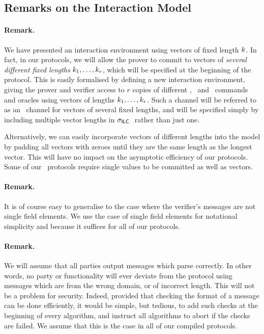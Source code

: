 \subsection{Remarks on the Interaction Model}

\paragraph{Remark.} We have presented an interaction environment using vectors of fixed length $k$. In fact, in our protocols, we will allow the prover to commit to vectors of \emph{several different fixed lengths} $k_1,\ldots,k_r$, which will be specified at the beginning of the protocol. This is easily formalised by defining a new interaction environment, giving the prover and verifier access to $r$ copies of different \ILCcommit, \ILCopen\ and \ILCcheck\ commands and oracles using vectors of lengths $k_1,\ldots,k_r$. Such a channel will be referred to as an \ILC\ channel for vectors of several fixed lengths, and will be specified simply by including multiple vector lengths in $\mathsf{\sigma}_{\mathsf{ILC}~}$ rather than just one.

Alternatively, we can easily incorporate vectors of different lengths into the model by padding all vectors with zeroes until they are the same length as the longest vector. This will have no impact on the asymptotic efficiency of our protocols. Some of our \ILC\ protocols require single values to be committed as well as vectors.

\paragraph{Remark.} It is of course easy to generalise to the case where the verifier's messages are not single field elements. We use the case of single field elements for notational simplicity and because it suffices for all of our protocols.

\paragraph{Remark.} We will assume that all parties output messages which parse correctly. In other words, no party or functionality will ever deviate from the protocol using messages which are from the wrong domain, or of incorrect length. This will not be a problem for security. Indeed, provided that checking the format of a message can be done efficiently, it would be simple, but tedious, to add such checks at the beginning of every algorithm, and instruct all algorithms to abort if the checks are failed. We assume that this is the case in all of our compiled protocols.

